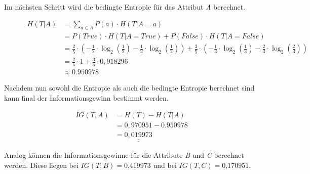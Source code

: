 Im nächsten Schritt wird die bedingte Entropie für das Attribut \textit{A} berechnet. \autocites{BedingteEntropie:online}{ConditionalEntropy:online}

\begin{figure}[htbp]
    \centering
    \begin{align*}
        H(T\vert A) &= \sum\limits_{a\in A}P(a) \cdot H(T\vert A=a) \\
                    &= P(True) \cdot H(T\vert A=True) + P(False) \cdot H(T\vert A=False) \\
                    &= \frac{2}{5} \cdot \left( -\frac{1}{2} \cdot \log_2\left( \frac{1}{2} \right) - \frac{1}{2} \cdot \log_{2}\left( \frac{1}{2} \right) \right) + \frac{3}{5} \cdot \left( -\frac{1}{3} \cdot \log_{2}\left( \frac{1}{3} \right) - \frac{2}{3} \cdot \log_{2}\left( \frac{2}{3} \right) \right) \\
                    &= \frac{2}{5} \cdot 1 + \frac{3}{5} \cdot 0,918296\\
                    &\approx 0.950978
    \end{align*}
\end{figure}

Nachdem nun sowohl die Entropie als auch die bedingte Entropie berechnet sind kann final der Informationsgewinn bestimmt werden.

\begin{figure}[h]
    \vspace{0.5cm}
    \centering
    \begin{align*}
        IG(T,A) &= H(T) - H(T\vert A) \\
                &= 0,970951 - 0.950978 \\
                &= \underline{\underline{0,019973}}
    \end{align*}
\end{figure}

Analog können die Informationsgewinne für die Attribute \textit{B} und \textit{C} berechnet werden. Diese liegen bei $ IG(T, B) = \textit{0,419973} $ und bei $ IG(T, C) = \textit{0,170951} $.

